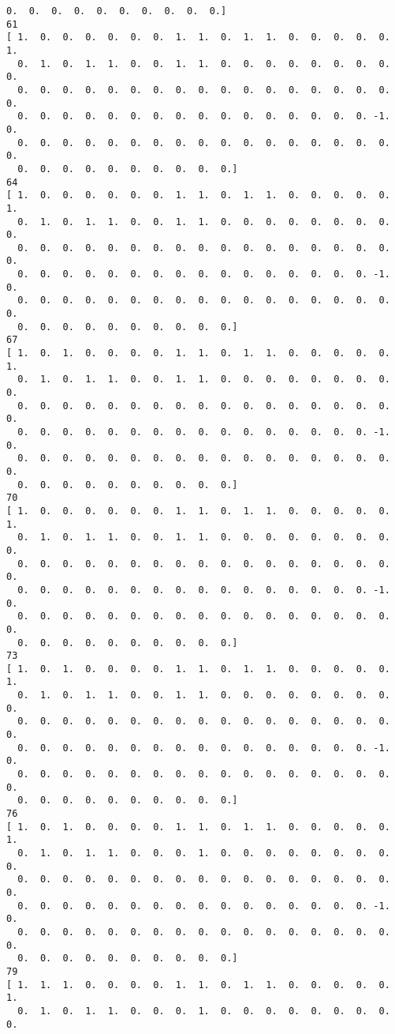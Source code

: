 \documentclass[11pt]{article}
\begin{document}
\begin{Verbatim}[commandchars=\\\{\}]
  0.  0.  0.  0.  0.  0.  0.  0.  0.  0.]
61
[ 1.  0.  0.  0.  0.  0.  0.  1.  1.  0.  1.  1.  0.  0.  0.  0.  0.  1.
  0.  1.  0.  1.  1.  0.  0.  1.  1.  0.  0.  0.  0.  0.  0.  0.  0.  0.
  0.  0.  0.  0.  0.  0.  0.  0.  0.  0.  0.  0.  0.  0.  0.  0.  0.  0.
  0.  0.  0.  0.  0.  0.  0.  0.  0.  0.  0.  0.  0.  0.  0.  0. -1.  0.
  0.  0.  0.  0.  0.  0.  0.  0.  0.  0.  0.  0.  0.  0.  0.  0.  0.  0.
  0.  0.  0.  0.  0.  0.  0.  0.  0.  0.]
64
[ 1.  0.  0.  0.  0.  0.  0.  1.  1.  0.  1.  1.  0.  0.  0.  0.  0.  1.
  0.  1.  0.  1.  1.  0.  0.  1.  1.  0.  0.  0.  0.  0.  0.  0.  0.  0.
  0.  0.  0.  0.  0.  0.  0.  0.  0.  0.  0.  0.  0.  0.  0.  0.  0.  0.
  0.  0.  0.  0.  0.  0.  0.  0.  0.  0.  0.  0.  0.  0.  0.  0. -1.  0.
  0.  0.  0.  0.  0.  0.  0.  0.  0.  0.  0.  0.  0.  0.  0.  0.  0.  0.
  0.  0.  0.  0.  0.  0.  0.  0.  0.  0.]
67
[ 1.  0.  1.  0.  0.  0.  0.  1.  1.  0.  1.  1.  0.  0.  0.  0.  0.  1.
  0.  1.  0.  1.  1.  0.  0.  1.  1.  0.  0.  0.  0.  0.  0.  0.  0.  0.
  0.  0.  0.  0.  0.  0.  0.  0.  0.  0.  0.  0.  0.  0.  0.  0.  0.  0.
  0.  0.  0.  0.  0.  0.  0.  0.  0.  0.  0.  0.  0.  0.  0.  0. -1.  0.
  0.  0.  0.  0.  0.  0.  0.  0.  0.  0.  0.  0.  0.  0.  0.  0.  0.  0.
  0.  0.  0.  0.  0.  0.  0.  0.  0.  0.]
70
[ 1.  0.  0.  0.  0.  0.  0.  1.  1.  0.  1.  1.  0.  0.  0.  0.  0.  1.
  0.  1.  0.  1.  1.  0.  0.  1.  1.  0.  0.  0.  0.  0.  0.  0.  0.  0.
  0.  0.  0.  0.  0.  0.  0.  0.  0.  0.  0.  0.  0.  0.  0.  0.  0.  0.
  0.  0.  0.  0.  0.  0.  0.  0.  0.  0.  0.  0.  0.  0.  0.  0. -1.  0.
  0.  0.  0.  0.  0.  0.  0.  0.  0.  0.  0.  0.  0.  0.  0.  0.  0.  0.
  0.  0.  0.  0.  0.  0.  0.  0.  0.  0.]
73
[ 1.  0.  1.  0.  0.  0.  0.  1.  1.  0.  1.  1.  0.  0.  0.  0.  0.  1.
  0.  1.  0.  1.  1.  0.  0.  1.  1.  0.  0.  0.  0.  0.  0.  0.  0.  0.
  0.  0.  0.  0.  0.  0.  0.  0.  0.  0.  0.  0.  0.  0.  0.  0.  0.  0.
  0.  0.  0.  0.  0.  0.  0.  0.  0.  0.  0.  0.  0.  0.  0.  0. -1.  0.
  0.  0.  0.  0.  0.  0.  0.  0.  0.  0.  0.  0.  0.  0.  0.  0.  0.  0.
  0.  0.  0.  0.  0.  0.  0.  0.  0.  0.]
76
[ 1.  0.  1.  0.  0.  0.  0.  1.  1.  0.  1.  1.  0.  0.  0.  0.  0.  1.
  0.  1.  0.  1.  1.  0.  0.  0.  1.  0.  0.  0.  0.  0.  0.  0.  0.  0.
  0.  0.  0.  0.  0.  0.  0.  0.  0.  0.  0.  0.  0.  0.  0.  0.  0.  0.
  0.  0.  0.  0.  0.  0.  0.  0.  0.  0.  0.  0.  0.  0.  0.  0. -1.  0.
  0.  0.  0.  0.  0.  0.  0.  0.  0.  0.  0.  0.  0.  0.  0.  0.  0.  0.
  0.  0.  0.  0.  0.  0.  0.  0.  0.  0.]
79
[ 1.  1.  1.  0.  0.  0.  0.  1.  1.  0.  1.  1.  0.  0.  0.  0.  0.  1.
  0.  1.  0.  1.  1.  0.  0.  0.  1.  0.  0.  0.  0.  0.  0.  0.  0.  0.

\end{Verbatim}
\end{document}
